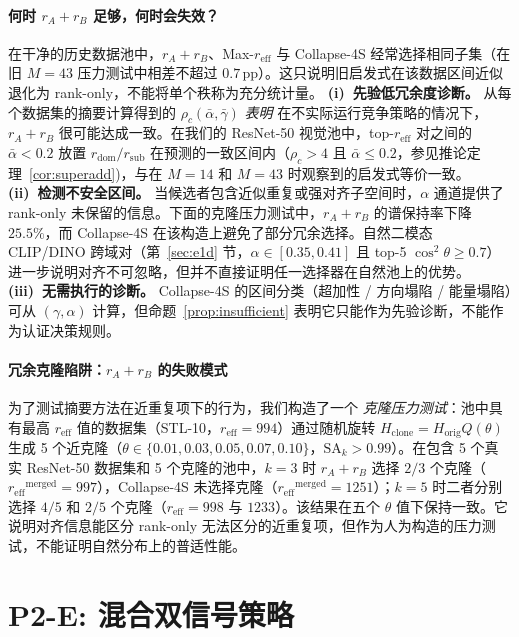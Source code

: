 \documentclass{article}
\newcommand{\reff}{\ensuremath{r_{\mathrm{eff}}}\xspace}
\newcommand{\SAk}{\ensuremath{\mathrm{SA}_k}\xspace}
\begin{document}
\paragraph{何时 $r_A{+}r_B$ 足够，何时会失效？}
在干净的历史数据池中，$r_A{+}r_B$、Max-$\reff$ 与 Collapse-4S 经常选择相同子集（在旧 $M{=}43$ 压力测试中相差不超过 $0.7$\,pp）。这只说明旧启发式在该数据区间近似退化为 rank-only，不能将单个秩称为充分统计量。
\textbf{(i)~先验低冗余度诊断。}
从每个数据集的摘要计算得到的 $\rho_c(\bar\alpha,\bar\gamma)$ \emph{表明} 在不实际运行竞争策略的情况下，$r_A{+}r_B$ 很可能达成一致。在我们的 ResNet-50 视觉池中，top-$\reff$ 对之间的 $\bar\alpha{<}0.2$ 放置 $r_{\mathrm{dom}}/r_{\mathrm{sub}}$ 在预测的一致区间内（$\rho_c{>}4$ 且 $\bar\alpha{\leq}0.2$，参见推论定理~\ref{cor:superadd})，与在 $M{=}14$ 和 $M{=}43$ 时观察到的启发式等价一致。
\textbf{(ii)~检测不安全区间。}
当候选者包含近似重复或强对齐子空间时，$\alpha$ 通道提供了 rank-only 未保留的信息。下面的克隆压力测试中，$r_A{+}r_B$ 的谱保持率下降 $25.5\%$，而 Collapse-4S 在该构造上避免了部分冗余选择。自然二模态 CLIP/DINO 跨域对（第~\ref{sec:e1d} 节，$\alpha\in[0.35,0.41]$ 且 top-5 $\cos^2\theta\geq0.7$）进一步说明对齐不可忽略，但并不直接证明任一选择器在自然池上的优势。
\textbf{(iii)~无需执行的诊断。}
Collapse-4S 的区间分类（超加性 / 方向塌陷 / 能量塌陷）可从 $(\gamma,\alpha)$ 计算，但命题~\ref{prop:insufficient} 表明它只能作为先验诊断，不能作为认证决策规则。
\paragraph{冗余克隆陷阱：$r_A{+}r_B$ 的失败模式}
为了测试摘要方法在近重复项下的行为，我们构造了一个 \emph{克隆压力测试}：池中具有最高 $\reff$ 值的数据集（STL-10，$\reff{=}994$）通过随机旋转 $H_{\mathrm{clone}}{=}H_{\mathrm{orig}}Q(\theta)$ 生成 5 个近克隆（$\theta\in\{0.01,0.03,0.05,0.07,0.10\}$，$\SAk{>}0.99$）。在包含 5 个真实 ResNet-50 数据集和 5 个克隆的池中，$k{=}3$ 时 $r_A{+}r_B$ 选择 $2/3$ 个克隆（$\reff^{\mathrm{merged}}{=}997$），Collapse-4S 未选择克隆（$\reff^{\mathrm{merged}}{=}1251$）；$k{=}5$ 时二者分别选择 $4/5$ 和 $2/5$ 个克隆（$\reff{=}998$ 与 $1233$）。该结果在五个 $\theta$ 值下保持一致。它说明对齐信息能区分 rank-only 无法区分的近重复项，但作为人为构造的压力测试，不能证明自然分布上的普适性能。

\section{P2-E: 混合双信号策略}
\label{app:p2e_hybrid}
\end{document}
